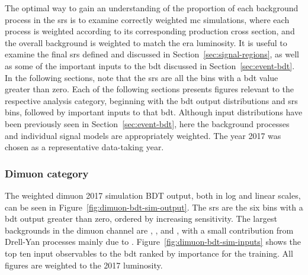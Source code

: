 The optimal way to gain an understanding of the proportion of each background process in the \glspl{sr} is to examine correctly weighted \gls{mc} simulations, where each process is weighted according to its corresponding production cross section, and the overall background is weighted to match the era luminosity. It is useful to examine the final \glspl{sr} defined and discussed in Section~\ref{sec:signal-regions}, as well as some of the important inputs to the \gls{bdt} discussed in Section~\ref{sec:event-bdt}. In the following sections, note that the \glspl{sr} are all the bins with a \gls{bdt} value greater than zero. Each of the following sections presents figures relevant to the respective analysis category, beginning with the \gls{bdt} output distributions and \glspl{sr} bins, followed by important inputs to that \gls{bdt}. Although input distributions have been previously seen in Section~\ref{sec:event-bdt}, here the background processes and individual signal models are appropriately weighted. The year 2017 was chosen as a representative data-taking year.

\clearpage
\subsubsection{Dimuon category}
\label{sec:dimuon-category-background-char}

The weighted dimuon 2017 simulation BDT output, both in log and linear scales, can be seen in Figure~\ref{fig:dimuon-bdt-sim-output}. The \glspl{sr} are the six bins with a \gls{bdt} output greater than zero, ordered by increasing sensitivity. The largest backgrounds in the dimuon channel are \ttbar, \zjets, and \wjets, with a small contribution from Drell-Yan processes mainly due to \ztautau. Figure~\ref{fig:dimuon-bdt-sim-inputs} shows the top ten input observables to the \gls{bdt} ranked by importance for the training. All figures are weighted to the 2017 luminosity.

